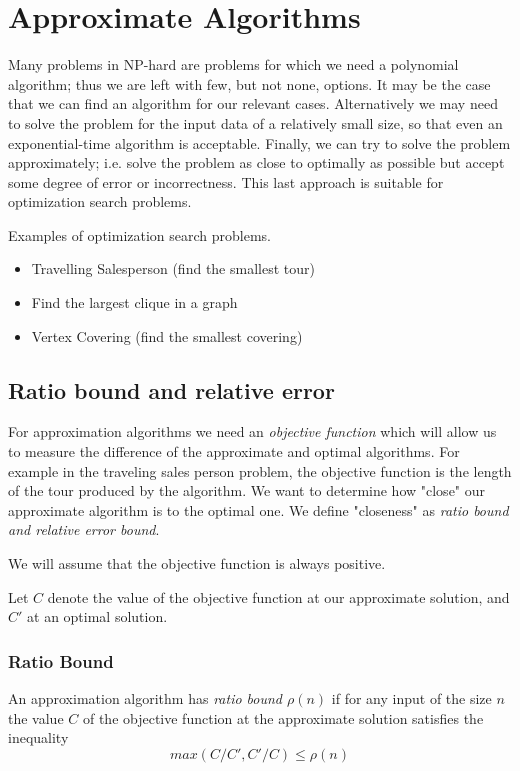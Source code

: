 \section{Approximate Algorithms}
Many problems in NP-hard are problems for which we need a polynomial algorithm;
thus we are left with few, but not none, options.
It may be the case that we can find an algorithm for our relevant cases.
Alternatively we may need to solve the problem for the input
data of a relatively small size, so that even an exponential-time algorithm is acceptable.
Finally, we can try to solve the problem approximately;
i.e. solve the problem as close to optimally as possible but accept some degree of error
or incorrectness.
This last approach is suitable for optimization search problems.

Examples of optimization search problems.
\begin{itemize}
    \item Travelling Salesperson (find the smallest tour)
    \item Find the largest clique in a graph
    \item Vertex Covering (find the smallest covering)
\end{itemize}

\subsection{Ratio bound and relative error}
For approximation algorithms we need an \textit{objective function}
which will allow us to measure the difference of the approximate and optimal algorithms.
For example in the traveling sales person problem,
the objective function is the length of the tour produced by the algorithm.
We want to determine how "close" our approximate algorithm is to the
optimal one.  We define "closeness" as \textit{ratio bound and relative error bound}.

We will assume that the objective function is always positive.

Let $C$ denote the value of the objective function at our approximate solution,
and $C\prime$ at an optimal solution.

\subsubsection{Ratio Bound}
\begin{definition}
    An approximation algorithm has \textit{ratio bound $\rho(n)$}
    if for any input of the size $n$ the value $C$ of the objective function
    at the approximate solution satisfies the inequality
    $$
    max(C/C\prime, C\prime/C) \leq \rho(n)
    $$
\end{definition}

